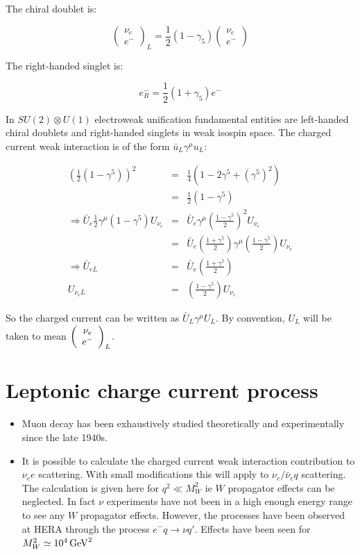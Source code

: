 The chiral doublet is:

\[
  \left(
    \begin{array}{c}
    \nu_{e} \\
    e^-
    \end{array}
  \right)_L
  = \frac{1}{2}\left(1 - \gamma_5\right)
  \left(
    \begin{array}{c}
    \nu_{e} \\
    e^-
    \end{array}
  \right)
\]

The right-handed singlet is:

\[
  e^-_R = \frac{1}{2}\left(1 + \gamma_5\right)e^-
\]

In $SU(2)\otimes U(1)$ electroweak unification fundamental entities are left-handed chiral doublets and right-handed singlets in weak isospin space.  The charged current weak interaction is of the form $\bar{u}_L\gamma^{\mu}u_L$:

\begin{eqnarray*}
  \left(\frac{1}{2}\left(1 - \gamma^5\right)\right)^2 & = & \frac{1}{4}\left(1 - 2\gamma^5 + \left(\gamma^5\right)^2\right) \\
  & = & \frac{1}{2}\left(1 - \gamma^5\right) \\
  \Rightarrow \bar{U}_e \frac{1}{2}\gamma^{\mu}\left(1 - \gamma^5\right)U_{\nu_e} & = & \bar{U}_e \gamma^{\mu}\left(\frac{1 - \gamma^5}{2}\right)^2U_{\nu_e} \\
  & = & \bar{U}_e \left(\frac{1 + \gamma^5}{2}\right)\gamma^{\mu}\left(\frac{1 - \gamma^5}{2}\right)U_{\nu_e} \\
  \Rightarrow \bar{U}_{eL} & = & \bar{U}_e\left(\frac{1 + \gamma^5}{2}\right) \\
  U_{\nu_eL} & = & \left(\frac{1 - \gamma^5}{2}\right)U_{\nu_e}
\end{eqnarray*}

So the charged current can be written as $\bar{U}_L \gamma^{\mu}U_L$.  By convention, $U_L$ will be taken to mean $\left(\begin{array}{c}\nu_e\\ e^-\end{array}\right)_L$.

\section{Leptonic charge current process}

\begin{itemize}
  \item Muon decay has been exhaustively studied theoretically and experimentally since the late 1940s.
  \item It is possible to calculate the charged current weak interaction contribution to $\nu_e e$ scattering.  With small modifications this will apply to $\nu_e / \bar{\nu}_e q$ scattering.  The calculation is given here for $q^2 \ll M_W^2$ ie $W$ propagator effects can be neglected.  In fact $\nu$ experiments have not been in a high enough energy range to see any $W$ propagator effects.  However, the processes have been observed at HERA through the process $e^- q \to \nu q'$.  Effects have been seen for $M_W^2 \simeq 10^4 \mathrm{\,GeV}^2$
\end{itemize}

